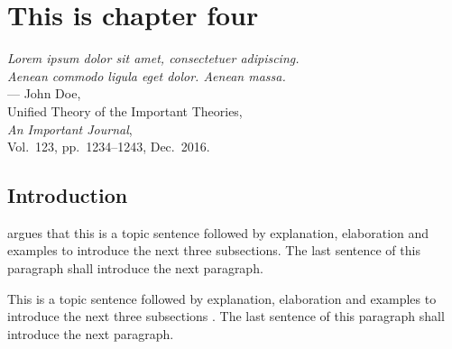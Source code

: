 

%
%
\chapter{This is chapter four}
\label{ch:name4}

\begin{flushright}
{\slshape Lorem ipsum dolor sit amet, consectetuer adipiscing.}\\
{\slshape Aenean commodo ligula eget dolor. Aenean massa.}\\
\medskip
--- John Doe,\\
Unified Theory of the Important Theories,\\
{\slshape An Important Journal},\\
Vol.~123, pp.~1234--1243, Dec.~2016.\\
\end{flushright}

\bigskip




\section{Introduction}
\label{sec:ch_4_introduction}

\citet{Berg2016} argues that this is a topic sentence followed by explanation, elaboration and examples to introduce the next three subsections. The last sentence of this paragraph shall introduce the next paragraph. \lipsum[1]

This is a topic sentence followed by explanation, elaboration and examples to introduce the next three subsections \citep{Collins2016}. The last sentence of this paragraph shall introduce the next paragraph. \lipsum[1]

